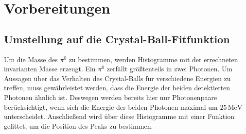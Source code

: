 \documentclass[a4paper,11pt,oneside,final,german,openbib,pdftex]{scrbook}
\begin{document}
{















\chapter{Vorbereitungen}
\label{chap:Vorbereitung}


\section{Umstellung auf die Crystal-Ball-Fitfunktion}
\label{sec:CB-Funktion}

Um die Masse des $\pi^0$ zu bestimmen, werden Histogramme mit der errechneten invarianten Masse erzeugt. Ein $\pi^0$ zerf\"allt gr\"o{\ss}tenteils in zwei Photonen. 
Um Aussagen \"uber das Verhalten des Crystal-Balls f\"ur verschiedene Energien zu treffen, muss gew\"ahrleistet werden, dass die Energie der beiden detektierten Photonen \"ahnlich ist. Deswegen werden bereits hier nur Photonenpaare ber\"ucksichtigt, wenn sich die Energie der beiden Photonen maximal um $25\,\text{MeV}$ unterscheidet.
 Anschlie{\ss}end wird \"uber diese Histogramme mit einer Funktion gefittet, um die Position des Peaks zu bestimmen.

}
\end{document}
